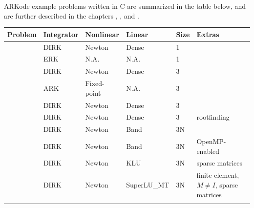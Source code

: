 \documentclass[letterpaper,10pt,english]{sphinxmanual}
\begin{document}
ARKode example problems written in C are summarized in the table
below, and are further described in the chapters {\hyperref[c_serial:serial-c]{\emph{}}},
{\hyperref[c_openmp:openmp-c]{\emph{}}}, {\hyperref[c_parallel:parallel-c]{\emph{}}} and {\hyperref[c_parhyp:parhyp-c]{\emph{}}}.

\begin{tabulary}{\linewidth}{|L|L|L|L|L|L|}
\hline
\textsf{\relax 
Problem
} & \textsf{\relax 
Integrator
} & \textsf{\relax 
Nonlinear
} & \textsf{\relax 
Linear
} & \textsf{\relax 
Size
} & \textsf{\relax 
Extras
}\\
\hline
{\hyperref[c_serial:ark-analytic]{\emph{}}}
 & 
DIRK
 & 
Newton
 & 
Dense
 & 
1
 & \\
\hline
{\hyperref[c_serial:ark-analytic-nonlin]{\emph{}}}
 & 
ERK
 & 
N.A.
 & 
N.A.
 & 
1
 & \\
\hline
{\hyperref[c_serial:ark-brusselator]{\emph{}}}
 & 
DIRK
 & 
Newton
 & 
Dense
 & 
3
 & \\
\hline
{\hyperref[c_serial:ark-brusselator-fp]{\emph{}}}
 & 
ARK
 & 
Fixed-point
 & 
N.A.
 & 
3
 & \\
\hline
{\hyperref[c_serial:ark-robertson]{\emph{}}}
 & 
DIRK
 & 
Newton
 & 
Dense
 & 
3
 & \\
\hline
{\hyperref[c_serial:ark-robertson-root]{\emph{}}}
 & 
DIRK
 & 
Newton
 & 
Dense
 & 
3
 & 
rootfinding
\\
\hline
{\hyperref[c_serial:ark-brusselator1d]{\emph{}}}
 & 
DIRK
 & 
Newton
 & 
Band
 & 
3N
 & \\
\hline
{\hyperref[c_openmp:ark-brusselator1d-omp]{\emph{}}}
 & 
DIRK
 & 
Newton
 & 
Band
 & 
3N
 & 
OpenMP-enabled
\\
\hline
{\hyperref[c_serial:ark-brusselator1d-klu]{\emph{}}}
 & 
DIRK
 & 
Newton
 & 
KLU
 & 
3N
 & 
sparse matrices
\\
\hline
{\hyperref[c_serial:ark-brusselator1d-fem-slu]{\emph{}}}
 & 
DIRK
 & 
Newton
 & 
SuperLU\_MT
 & 
3N
 & 
finite-element, \(M\ne I\), sparse matrices
\\
\hline
{\hyperref[c_serial:ark-heat1d]{\emph{}}}

\end{tabulary}
\end{document}
